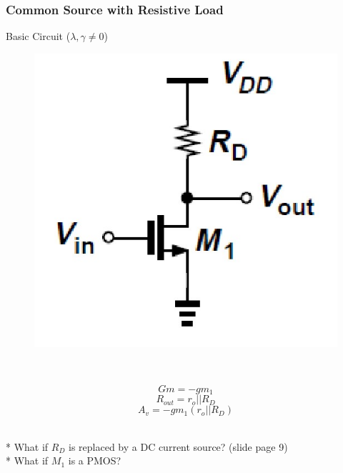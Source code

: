 \documentclass{beamer}
\begin{document}
\begin{frame}
\frametitle{Common Source with Resistive Load}
\begin{minipage}{0.48\linewidth}
    Basic Circuit ($\lambda, \gamma\not=0$)
    \begin{figure}[H]
        \centering
        \includegraphics[width=0.8\linewidth]{common-source-R}
    \end{figure}
\end{minipage}
\, 
\begin{minipage}{0.48\linewidth}
    \begin{equation*}
        Gm = -gm_1
    \end{equation*} 
    \begin{equation*}
        R_{out} = r_o||R_D
    \end{equation*}
    \begin{equation*}
        A_v = -gm_1(r_o||R_D)
    \end{equation*}
\end{minipage}\\
* What if $R_D$ is replaced by a DC current source? (slide page 9)\\
* What if $M_1$ is a PMOS?
\end{frame}
\end{document}
